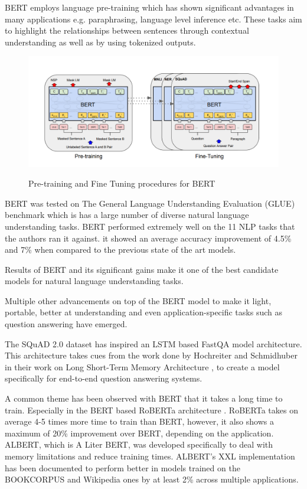 \documentclass[11pt]{article}
\begin{document}
\begin{enumerate}
        BERT employs language pre-training \citep{dai} which has shown significant advantages in many applications e.g. paraphrasing, language level inference etc. These tasks aim to highlight the relationships between sentences through contextual understanding as well as by using tokenized outputs.
        \begin{figure}[h!]
            \centering
            \includegraphics[scale=0.35]{BERT.png}
            \label{fig3}
            \caption{Pre-training and Fine Tuning procedures for BERT \citep{bert}}
        \end{figure}

        BERT was tested on The General Language Understanding Evaluation (GLUE) benchmark \citep{wang} which is has a large number of diverse natural language understanding tasks.
		BERT performed extremely well on the 11 NLP tasks that the authors ran it against. it showed an average accuracy improvement of 4.5\% and 7\% when compared to the previous state of the art models.

        Results of BERT and its significant gains make it one of the best candidate models for natural language understanding tasks.

	\end{enumerate}

    Multiple other advancements on top of the BERT model to make it light, portable, better at understanding and even application-specific tasks such as question answering have emerged.

    The SQuAD 2.0 dataset has inspired an LSTM based FastQA \citep{fastQA} model architecture. This architecture takes cues from the work done by Hochreiter and Schmidhuber in their work on Long Short-Term Memory Architecture \citep{lstm}, to create a model specifically for end-to-end question answering systems.

    A common theme has been observed with BERT that it takes a long time to train. Especially in the BERT based RoBERTa architecture \cite{roberta}. RoBERTa takes on average 4-5 times more time to train than BERT, however, it also shows a maximum of 20\% improvement over BERT, depending on the application. ALBERT, which is A Liter BERT, \cite{albert} was developed specifically to deal with memory limitations and reduce training times. ALBERT's XXL implementation has been documented to perform better in models trained on the BOOKCORPUS and Wikipedia ones by at least 2\% across multiple applications.
\end{document}
